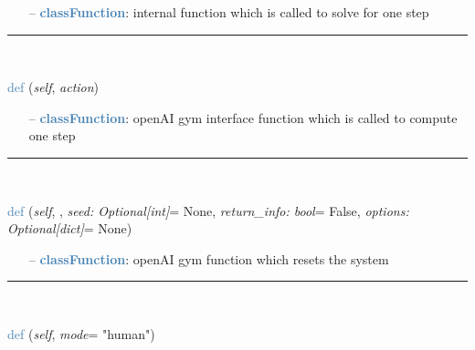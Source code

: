 \begin{itemize}[leftmargin=1.4cm]
\begin{itemize}[leftmargin=1.4cm]
\begin{itemize}[leftmargin=0.7cm]
\item[--]\textcolor{steelblue}{\bf classFunction}: internal function which is called to solve for one step
\vspace{12pt}\end{itemize}
%
\noindent\rule{8cm}{0.75pt}\vspace{1pt} \\ 
\begin{flushleft}
\noindent \textcolor{steelblue}{def {\bf {}}}\label{sec:artificialIntelligence:OpenAIGymInterfaceEnv(Env):step}
({\it self}, {\it action})
\end{flushleft}
\setlength{\itemindent}{0.7cm}
\begin{itemize}[leftmargin=0.7cm]
\item[--]\textcolor{steelblue}{\bf classFunction}: openAI gym interface function which is called to compute one step
\vspace{12pt}\end{itemize}
%
\noindent\rule{8cm}{0.75pt}\vspace{1pt} \\ 
\begin{flushleft}
\noindent \textcolor{steelblue}{def {\bf {}}}\label{sec:artificialIntelligence:OpenAIGymInterfaceEnv(Env):reset}
({\it self}, {\it *}, {\it seed: Optional[int]}= None, {\it return\_info: bool}= False, {\it options: Optional[dict]}= None)
\end{flushleft}
\setlength{\itemindent}{0.7cm}
\begin{itemize}[leftmargin=0.7cm]
\item[--]\textcolor{steelblue}{\bf classFunction}: openAI gym function which resets the system
\vspace{12pt}\end{itemize}
%
\noindent\rule{8cm}{0.75pt}\vspace{1pt} \\ 
\begin{flushleft}
\noindent \textcolor{steelblue}{def {\bf {}}}\label{sec:artificialIntelligence:OpenAIGymInterfaceEnv(Env):render}
({\it self}, {\it mode}= "human")
\end{flushleft}
\setlength{\itemindent}{0.7cm}

\end{itemize}
\end{itemize}
